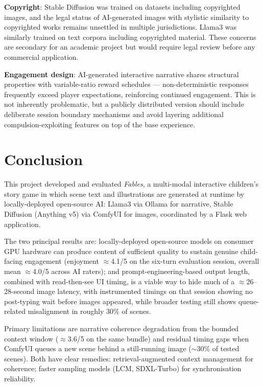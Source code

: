 \documentclass[12pt,a4paper]{article}
\begin{document}
\textbf{Copyright}: Stable Diffusion was trained on datasets including copyrighted images, and the legal status of AI-generated images with stylistic similarity to copyrighted works remains unsettled in multiple jurisdictions. Llama3 was similarly trained on text corpora including copyrighted material. These concerns are secondary for an academic project but would require legal review before any commercial application.

\textbf{Engagement design}: AI-generated interactive narrative shares structural properties with variable-ratio reward schedules --- non-deterministic responses frequently exceed player expectations, reinforcing continued engagement. This is not inherently problematic, but a publicly distributed version should include deliberate session boundary mechanisms and avoid layering additional compulsion-exploiting features on top of the base experience.

    \section{Conclusion}

This project developed and evaluated \textit{Fables}, a multi-modal interactive children's story game in which scene text and illustrations are generated at runtime by locally-deployed open-source AI: Llama3 via Ollama for narrative, Stable Diffusion (Anything v5) via ComfyUI for images, coordinated by a Flask web application.

The two principal results are: locally-deployed open-source models on consumer GPU hardware can produce content of sufficient quality to sustain genuine child-facing engagement (enjoyment $\approx$4.1/5 on the six-turn evaluation session, overall mean $\approx$4.0/5 across AI raters); and prompt-engineering-based output length, combined with read-then-see UI timing, is a viable way to hide much of a $\approx$26--28-second image latency, with instrumented timings on that session showing no post-typing wait before images appeared, while broader testing still shows queue-related misalignment in roughly 30\% of scenes.

Primary limitations are narrative coherence degradation from the bounded context window ($\approx$3.6/5 on the same bundle) and residual timing gaps when ComfyUI queues a new scene behind a still-running image ($\sim$30\% of tested scenes). Both have clear remedies: retrieval-augmented context management for coherence; faster sampling models (LCM, SDXL-Turbo) for synchronisation reliability.
\end{document}
